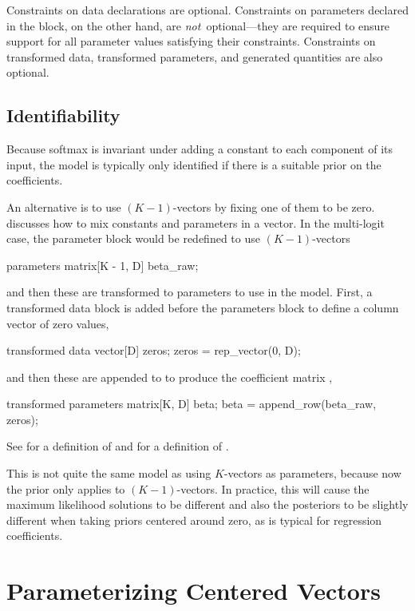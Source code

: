 Constraints on data declarations are optional.  Constraints on
parameters declared in the  block, on the other hand,
are {\it not}\ optional---they are required to ensure support for all
parameter values satisfying their constraints.  Constraints on
transformed data, transformed parameters, and generated quantities are
also optional.

\subsection{Identifiability}

Because softmax is invariant under adding a constant to each component
of its input, the model is typically only identified if there is a
suitable prior on the coefficients.

An alternative is to use $(K-1)$-vectors by fixing one of them to be
zero.  discusses how to mix 
constants and parameters in a vector.  In the multi-logit case, the
parameter block would be redefined to use $(K-1)$-vectors
%
\begin{stancode}
parameters {
  matrix[K - 1, D] beta_raw;
}
\end{stancode}
%
and then these are transformed to parameters to use in the model.
First, a transformed data block is added before the parameters block
to define a column vector of zero values,
%
\begin{stancode}
transformed data {
  vector[D] zeros;
  zeros = rep_vector(0, D);
}
\end{stancode}
%
and then these are appended to  to produce the
coefficient matrix ,
%
\begin{stancode}
transformed parameters {
  matrix[K, D] beta;
  beta = append_row(beta_raw, zeros);
}
\end{stancode}
%
See  for a definition of  and
 for a definition of
.

This is not quite the same model as using $K$-vectors as parameters,
because now the prior only applies to $(K-1)$-vectors.  In practice,
this will cause the maximum likelihood solutions to be different and
also the posteriors to be slightly different when taking priors
centered around zero, as is typical for regression coefficients.

\section{Parameterizing Centered Vectors}

